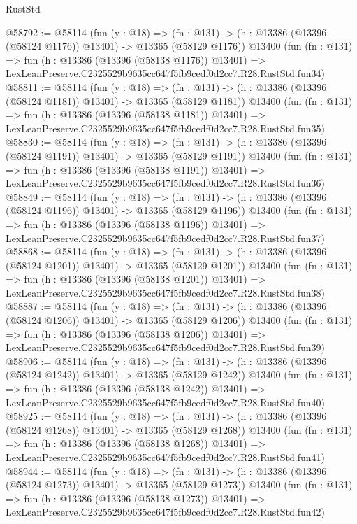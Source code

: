 \begin{lexlean}{RustStd}
\begin{coremodule}
@58792 := @58114
    (fun (y : @18) =>
    (fn : @131) -> (h : @13386 (@13396 (@58124 @1176)) @13401) -> @13365 (@58129 @1176))
    @13400
    (fun (fn : @131) =>
    fun (h : @13386 (@13396 (@58138 @1176)) @13401) =>
    LexLeanPreserve.C2325529b9635cc647f5fb9cedf0d2cc7.R28.RustStd.fun34)
@58811 := @58114
    (fun (y : @18) =>
    (fn : @131) -> (h : @13386 (@13396 (@58124 @1181)) @13401) -> @13365 (@58129 @1181))
    @13400
    (fun (fn : @131) =>
    fun (h : @13386 (@13396 (@58138 @1181)) @13401) =>
    LexLeanPreserve.C2325529b9635cc647f5fb9cedf0d2cc7.R28.RustStd.fun35)
@58830 := @58114
    (fun (y : @18) =>
    (fn : @131) -> (h : @13386 (@13396 (@58124 @1191)) @13401) -> @13365 (@58129 @1191))
    @13400
    (fun (fn : @131) =>
    fun (h : @13386 (@13396 (@58138 @1191)) @13401) =>
    LexLeanPreserve.C2325529b9635cc647f5fb9cedf0d2cc7.R28.RustStd.fun36)
@58849 := @58114
    (fun (y : @18) =>
    (fn : @131) -> (h : @13386 (@13396 (@58124 @1196)) @13401) -> @13365 (@58129 @1196))
    @13400
    (fun (fn : @131) =>
    fun (h : @13386 (@13396 (@58138 @1196)) @13401) =>
    LexLeanPreserve.C2325529b9635cc647f5fb9cedf0d2cc7.R28.RustStd.fun37)
@58868 := @58114
    (fun (y : @18) =>
    (fn : @131) -> (h : @13386 (@13396 (@58124 @1201)) @13401) -> @13365 (@58129 @1201))
    @13400
    (fun (fn : @131) =>
    fun (h : @13386 (@13396 (@58138 @1201)) @13401) =>
    LexLeanPreserve.C2325529b9635cc647f5fb9cedf0d2cc7.R28.RustStd.fun38)
@58887 := @58114
    (fun (y : @18) =>
    (fn : @131) -> (h : @13386 (@13396 (@58124 @1206)) @13401) -> @13365 (@58129 @1206))
    @13400
    (fun (fn : @131) =>
    fun (h : @13386 (@13396 (@58138 @1206)) @13401) =>
    LexLeanPreserve.C2325529b9635cc647f5fb9cedf0d2cc7.R28.RustStd.fun39)
@58906 := @58114
    (fun (y : @18) =>
    (fn : @131) -> (h : @13386 (@13396 (@58124 @1242)) @13401) -> @13365 (@58129 @1242))
    @13400
    (fun (fn : @131) =>
    fun (h : @13386 (@13396 (@58138 @1242)) @13401) =>
    LexLeanPreserve.C2325529b9635cc647f5fb9cedf0d2cc7.R28.RustStd.fun40)
@58925 := @58114
    (fun (y : @18) =>
    (fn : @131) -> (h : @13386 (@13396 (@58124 @1268)) @13401) -> @13365 (@58129 @1268))
    @13400
    (fun (fn : @131) =>
    fun (h : @13386 (@13396 (@58138 @1268)) @13401) =>
    LexLeanPreserve.C2325529b9635cc647f5fb9cedf0d2cc7.R28.RustStd.fun41)
@58944 := @58114
    (fun (y : @18) =>
    (fn : @131) -> (h : @13386 (@13396 (@58124 @1273)) @13401) -> @13365 (@58129 @1273))
    @13400
    (fun (fn : @131) =>
    fun (h : @13386 (@13396 (@58138 @1273)) @13401) =>
    LexLeanPreserve.C2325529b9635cc647f5fb9cedf0d2cc7.R28.RustStd.fun42)

\end{coremodule}
\end{lexlean}
